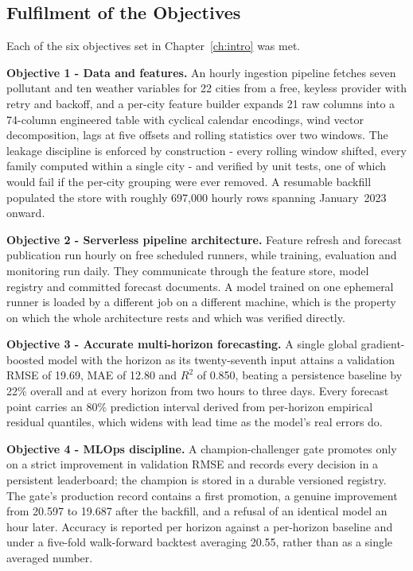 \subsection{Fulfilment of the Objectives}
Each of the six objectives set in Chapter~\ref{ch:intro} was met.

\textbf{Objective 1 - Data and features.} An hourly ingestion pipeline fetches
seven pollutant and ten weather variables for 22 cities from a free, keyless
provider with retry and backoff, and a per-city feature builder expands 21 raw
columns into a 74-column engineered table with cyclical calendar encodings, wind
vector decomposition, lags at five offsets and rolling statistics over two
windows. The leakage discipline is enforced by construction - every rolling
window shifted, every family computed within a single city - and verified by
unit tests, one of which would fail if the per-city grouping were ever removed. A
resumable backfill populated the store with roughly 697,000 hourly rows spanning
January~2023 onward.

\textbf{Objective 2 - Serverless pipeline architecture.} Feature refresh and
forecast publication run hourly on free scheduled runners, while training,
evaluation and monitoring run daily. They communicate through the feature store,
model registry and committed forecast documents. A model trained on one ephemeral runner is
loaded by a different job on a different machine, which is the property on which
the whole architecture rests and which was verified directly.

\textbf{Objective 3 - Accurate multi-horizon forecasting.} A single global
gradient-boosted model with the horizon as its twenty-seventh input attains a
validation RMSE of 19.69, MAE of 12.80 and $R^2$ of 0.850, beating a persistence
baseline by 22\% overall and at every horizon from two hours to three days. Every
forecast point carries an 80\% prediction interval derived from per-horizon
empirical residual quantiles, which widens with lead time as the model's real
errors do.

\textbf{Objective 4 - MLOps discipline.} A champion-challenger gate promotes
only on a strict improvement in validation RMSE and records every decision in a
persistent leaderboard; the champion is stored in a durable versioned registry.
The gate's production record contains a first promotion, a genuine improvement
from 20.597 to 19.687 after the backfill, and a refusal of an identical model an
hour later. Accuracy is reported per horizon against a per-horizon baseline and
under a five-fold walk-forward backtest averaging 20.55, rather than as a single
averaged number.

